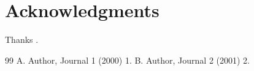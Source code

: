 \documentclass{article}
\begin{document}
\section*{Acknowledgments}
Thanks \cite{a,b}.
\begin{chapthebibliography}{99}
 A. Author, Journal 1 (2000) 1.
 B. Author, Journal 2 (2001) 2.
\end{chapthebibliography}
\end{document}
